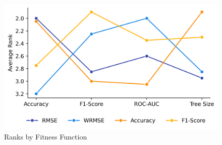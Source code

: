 
    \begin{figure}[H]
    \centering
    \includegraphics[width=\linewidth]{../Latex/Chapters/Figures/Results/fitness_test_ranks.png}
    \caption{Ranks by Fitness Function}
    \label{fig:fitness_test_ranks}
    \end{figure}
    